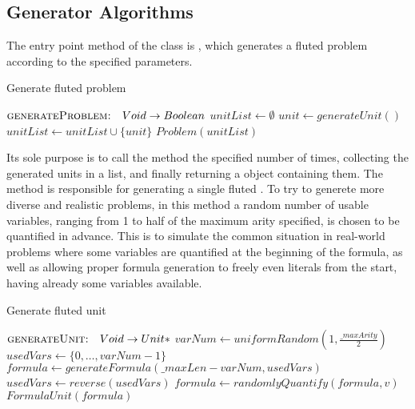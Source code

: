 \subsection{Generator Algorithms}\label{subsec:generator-algorithms}

The entry point method of the  class is , which generates a fluted problem according to the specified parameters.

\begin{algorithm}[H]
  \caption{Generate fluted problem}\label{alg:generate-fluted-problem}
  \begin{algorithmic}[1]
      \Statex{}  \(\textsc{generateProblem:} \quad Void \to Boolean\)
        \State{} \(unitList \gets \emptyset\)
          \State{} \(unit \gets generateUnit()\)
          \State{} \(unitList \gets unitList \cup \{unit\}\)
        \EndFor{}
        \State{} \Return{} \(Problem(unitList)\)
      \EndFunction{}
  \end{algorithmic}
\end{algorithm}


Its sole purpose is to call the  method the specified number of times, collecting the generated units in a list, and finally returning a  object containing them.
The  method is responsible for generating a single fluted .
To try to generete more diverse and realistic problems, in this method a random number of usable variables, ranging from 1 to half of the maximum arity specified, is chosen to be quantified in advance.
This is to simulate the common situation in real-world problems where some variables are quantified at the beginning of the formula, as well as allowing proper formula generation to freely even literals from the start, having already some variables available.

\begin{algorithm}[H]
  \caption{Generate fluted unit}\label{alg:generate-fluted-unit}
  \begin{algorithmic}[1]
      \Statex{}  \(\textsc{generateUnit:} \quad Void \to Unit*\)
        \State{} \(varNum \gets uniformRandom(1, \frac{\_maxArity}{2})\)
        \State{} \(usedVars \gets \{0,\ldots,varNum-1\}\)
        \State{} \(formula \gets generateFormula(\_maxLen-varNum, usedVars)\)
        \State{} \(usedVars \gets reverse(usedVars)\)
          \State{} \(formula \gets randomlyQuantify(formula, v)\)
        \EndFor{}
        \State{} \Return{} \(FormulaUnit(formula)\)
      \EndFunction{}
  \end{algorithmic}
\end{algorithm}

